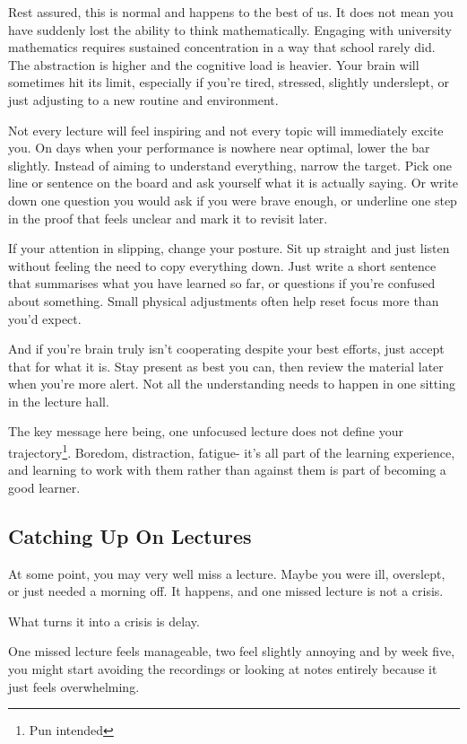 Rest assured, this is normal and happens to the best of us. It does not mean you have suddenly lost the ability to think mathematically. Engaging with university mathematics requires sustained concentration in a way that school rarely did. The abstraction is higher and the cognitive load is heavier. Your brain will sometimes hit its limit, especially if you're tired, stressed, slightly underslept, or just adjusting to a new routine and environment. 

Not every lecture will feel inspiring and not every topic will immediately excite you. On days when your performance is nowhere near optimal, lower the bar slightly. Instead of aiming to understand everything, narrow the target. Pick one line or sentence on the board and ask yourself what it is actually saying. Or write down one question you would ask if you were brave enough, or underline one step in the proof that feels unclear and mark it to revisit later. 

If your attention in slipping, change your posture. Sit up straight and just listen without feeling the need to copy everything down. Just write a short sentence that summarises what you have learned so far, or questions if you're confused about something. Small physical adjustments often help reset focus more than you'd expect. 

And if you're brain truly isn't cooperating despite your best efforts, just accept that for what it is. Stay present as best you can, then review the material later when you're more alert. Not all the understanding needs to happen in one sitting in the lecture hall. 

The key message here being, one unfocused lecture does not define your trajectory\footnote{Pun intended}. Boredom, distraction, fatigue- it's all part of the learning experience, and learning to work with them rather than against them is part of becoming a good learner. 


\subsection{Catching Up On Lectures}

At some point, you may very well miss a lecture. Maybe you were ill, overslept, or just needed a morning off. It happens, and one missed lecture is not a crisis.

What turns it into a crisis is delay. 

One missed lecture feels manageable, two feel slightly annoying and by week five, you might start avoiding the recordings or looking at notes entirely because it just feels overwhelming. 

